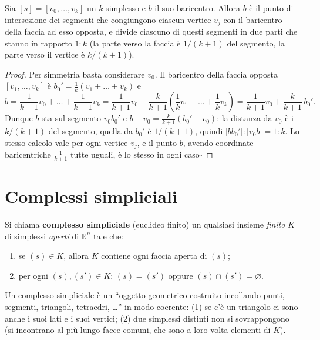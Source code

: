 \begin{prop}
Sia $[s] = [v_0, \dots, v_k]$ un $k$-simplesso e $b$ il suo baricentro. Allora $b$ \`e il punto di intersezione dei segmenti che congiungono ciascun vertice $v_j$ con il baricentro della faccia ad esso opposta, e divide ciascuno di questi segmenti in due parti che stanno in rapporto $1 : k$ (la parte verso la faccia \`e $1/(k+1)$ del segmento, la parte verso il vertice \`e $k/(k+1)$).
\end{prop}
\begin{proof}
Per simmetria basta considerare $v_0$. Il baricentro della faccia opposta $[v_1, \dots, v_k]$ \`e $b_0' = \frac{1}{k}(v_1 + \dots + v_k)$ e
\[
b = \frac{1}{k+1} v_0 + \dots + \frac{1}{k+1} v_k = \frac{1}{k+1} v_0 + \frac{k}{k+1} \left( \frac1k v_1 + \dots + \frac1k v_k \right) = \frac{1}{k+1} v_0 + \frac{k}{k+1}\, b_0' .
\]
Dunque $b$ sta sul segmento $\overline{v_0 b_0'}$ e $b - v_0 = \frac{k}{k+1}(b_0' - v_0)$: la distanza da $v_0$ \`e i $k/(k+1)$ del segmento, quella da $b_0'$ \`e $1/(k+1)$, quindi $|b b_0'| : |v_0 b| = 1 : k$. Lo stesso calcolo vale per ogni vertice $v_j$, e il punto $b$, avendo coordinate baricentriche $\frac{1}{k+1}$ tutte uguali, \`e lo stesso in ogni caso\hfill$\square$
\end{proof}


\section{Complessi simpliciali}

\begin{definicion}
Si chiama \textbf{complesso simpliciale} (euclideo finito) un qualsiasi insieme \emph{finito} $K$ di simplessi \emph{aperti} di $\mathbb{R}^n$ tale che:
\begin{enumerate}
    \item[1)] se $(s) \in K$, allora $K$ contiene ogni faccia aperta di $(s)$;
    \item[2)] per ogni $(s), (s') \in K$: $(s) = (s')$ oppure $(s) \cap (s') = \varnothing$.
\end{enumerate}
\end{definicion}

\begin{intuizione}
Un complesso simpliciale \`e un ``oggetto geometrico costruito incollando punti, segmenti, triangoli, tetraedri, \dots'' in modo coerente: (1) se c'\`e un triangolo ci sono anche i suoi lati e i suoi vertici; (2) due simplessi distinti non si sovrappongono (si incontrano al pi\`u lungo facce comuni, che sono a loro volta elementi di $K$).
\end{intuizione}


